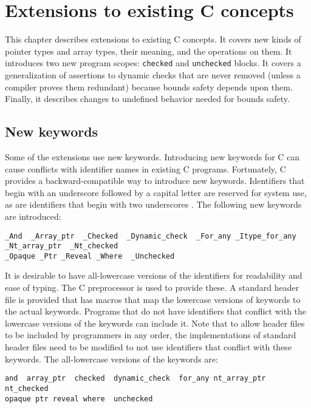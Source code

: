 
\chapter{Extensions to existing C concepts}
\label{chapter:core-extensions}

This chapter describes extensions to existing C concepts.
It covers new kinds of pointer types and array types, their meaning,
and the operations  on them.   It introduces two
new program scopes: \lstinline+checked+ and \lstinline+unchecked+
blocks. It covers a generalization of assertions to
dynamic checks that are never  removed (unless a compiler
proves them redundant) because bounds safety depends upon them.
Finally, it describes changes to
undefined behavior needed for bounds safety.

\section{New keywords}
Some of the extensions use new keywords.   Introducing new keywords
for C can cause conflicts with identifier names in existing C programs.
Fortunately, C provides a backward-compatible way to introduce new
keywords.  Identifiers that begin with an underscore followed by a
capital letter are reserved for system use, as are identifiers that
begin with two underscores \cite[Section 7.1.3]{ISO2011}. The following
new keywords are introduced:
\begin{lstlisting}
_And  _Array_ptr  _Checked  _Dynamic_check  _For_any _Itype_for_any _Nt_array_ptr  _Nt_checked
_Opaque _Ptr _Reveal _Where  _Unchecked
\end{lstlisting}

It is desirable to have all-lowercase versions of the
identifiers for readability and ease of typing. The C
preprocessor is used to provide these. A standard header
file  is provided that has macros
that map the lowercase versions of keywords to the actual keywords.
Programs that do not have identifiers that conflict with the
lowercase versions of the keywords can include it.
Note that to allow header files to be included by programmers in any order,
the implementations of standard header files need to be modified to
not use identifiers that conflict with these keywords.
The all-lowercase versions of the keywords are:
\begin{lstlisting}
and  array_ptr  checked  dynamic_check  for_any nt_array_ptr  nt_checked
opaque ptr reveal where  unchecked
\end{lstlisting}

